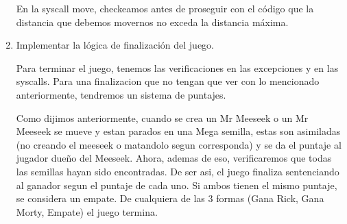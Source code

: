 \documentclass[a4paper]{article}
\begin{document}
\begin{enumerate}
	En la syscall move, checkeamos antes de proseguir con el c\'odigo que la distancia que debemos movernos no exceda la distancia m\'axima.
	
	\item Implementar la lógica de finalización del juego.
	
	Para terminar el juego, tenemos las verificaciones en las excepciones y en las syscalls. Para una finalizacion que no tengan que ver con lo mencionado anteriormente, tendremos un sistema de puntajes.
	
	Como dijimos anteriormente, cuando se crea un Mr Meeseek o un Mr Meeseek se mueve y estan parados en una Mega semilla, estas son asimiladas (no creando el meeseek o matandolo segun corresponda) y se da el puntaje al jugador due\~no del Meeseek. Ahora, ademas de eso, verificaremos que todas las semillas hayan sido encontradas. De ser asi, el juego finaliza sentenciando al ganador segun el puntaje de cada uno. Si ambos tienen el mismo puntaje, se considera un empate. De cualquiera de las 3 formas (Gana Rick, Gana Morty, Empate) el juego termina.
	
\end{enumerate}
\end{document}
